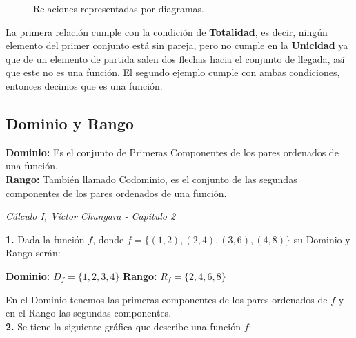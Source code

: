 \documentclass[12pt,a4paper]{book}
\newcommand*\ruleline[1]{\par\noindent\raisebox{.8ex}{\makebox[\linewidth]{\hrulefill\hspace{1ex}\raisebox{-.8ex}{#1}\hspace{1ex}\hrulefill}}}
\begin{document}
{{\begin{figure}[h]
\begin{subfigure}[b]{0.4\textwidth}
\begin{center}
\end{center}
\end{subfigure}

\caption{{\footnotesize Relaciones representadas por diagramas.}}
\end{figure}
{\footnotesize La primera relación cumple con la condición de \textbf{Totalidad}, es decir, ningún elemento del primer conjunto está sin pareja, pero no cumple en la \textbf{Unicidad} ya que de un elemento de partida salen dos flechas hacia el conjunto de llegada, así que este no es una función. El segundo ejemplo cumple con ambas condiciones, entonces decimos que es una función.}

\subsection{Dominio y Rango}

\begin{framed}\noindent
\textbf{Dominio: }Es el conjunto de Primeras Componentes de los pares ordenados de una función. \\${ }$\\
\textbf{Rango: } También llamado Codominio, es el conjunto de las segundas componentes de los pares ordenados de una función.
\begin{flushright}
\textit{{\scriptsize Cálculo I, Víctor Chungara - Capítulo 2}}
\end{flushright}
\vspace{-0.5cm}
\end{framed}
\ruleline{\textbf{Ejemplos}}
\textbf{1.} Dada la función $f$, donde $f=\lbrace (1,2),(2,4),(3,6),(4,8) \rbrace$ su Dominio y Rango serán:

\begin{center}
\textbf{Dominio: } $D_f = \lbrace 1,2,3,4 \rbrace$ \hspace{1.5cm} \textbf{Rango: } $R_f = \lbrace 2,4,6,8 \rbrace$
\end{center}
En el Dominio tenemos las primeras componentes de los pares ordenados de $f$ y en el Rango las segundas componentes.\\${ }$\\
\textbf{2.} Se tiene la siguiente gráfica que describe una función $f$:

}}
\end{document}
